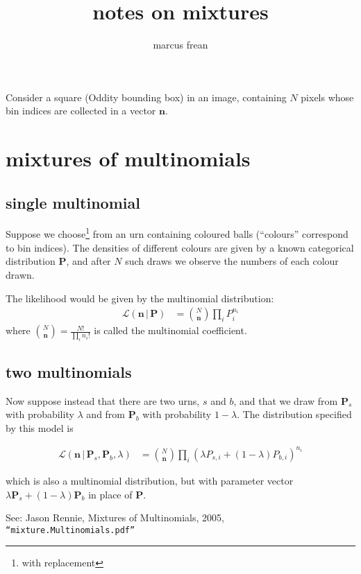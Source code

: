 \documentclass[11pt]{article}
\title{notes on mixtures}
\author{marcus frean}
\date{}
\newcommand{\given}{\,|\,}
\begin{document}
\sloppy\sloppypar
\maketitle

Consider a square (Oddity bounding box) in an image, containing $N$
pixels whose bin indices are collected in a vector $\mathbf{n}$.

\section{mixtures of multinomials}

\subsection{single multinomial}
Suppose we choose\footnote{with replacement} from an urn containing
coloured balls (``colours'' correspond to bin indices). The densities
of different colours are given by a known categorical distribution
$\mathbf{P}$, and after $N$ such draws we observe the numbers of each
colour drawn.

The likelihood would be given by the multinomial distribution:
\begin{align}
\mathcal{L}(\mathbf{n} \given \mathbf{P}) &= {N \choose \mathbf{n}} \prod_i P_i^{n_i}
\end{align}
where ${N \choose \mathbf{n}} = \frac{N!}{\prod_i n_i !}$ is called the multinomial coefficient.


\subsection{two multinomials}
Now suppose instead that there are two urns, $s$ and $b$, and that we
draw from $\mathbf{P}_s$ with probability $\lambda$ and from
$\mathbf{P}_b$ with probability $1-\lambda$. The distribution
specified by this model is
 
\begin{align}
\mathcal{L}(\mathbf{n} \given \mathbf{P}_s, \mathbf{P}_b, \lambda) 
&= {N \choose \mathbf{n}} \prod_i (\lambda P_{s,i} + (1-\lambda) P_{b,i})^{n_i}
\end{align}

which is also a multinomial distribution, but with parameter vector $\lambda \mathbf{P}_{s} + (1-\lambda) \mathbf{P}_{b}$ in place  of $\mathbf{P}$.

See: Jason Rennie, Mixtures of Multinomials, 2005, {\tt ``mixture.Multinomials.pdf'' }
\end{document}
